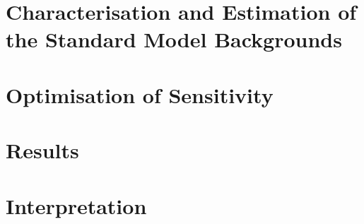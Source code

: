 \section{Characterisation and Estimation of the Standard Model Backgrounds}

\section{Optimisation of Sensitivity}

\section{Results}

\section{Interpretation}
